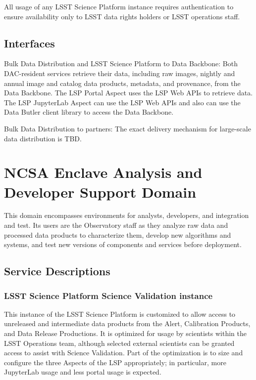 \documentclass[DM,toc]{lsstdoc}
\begin{document}
All usage of any LSST Science Platform instance requires authentication
to ensure availability only to LSST data rights holders or LSST
operations staff.

\subsection{Interfaces}\label{dac-interfaces}

Bulk Data Distribution and LSST Science Platform to Data Backbone: Both
DAC-resident services retrieve their data, including raw images, nightly and
annual image and catalog data products, metadata, and provenance, from the Data
Backbone.  The LSP Portal Aspect uses the LSP Web APIs to retrieve data.  The
LSP JupyterLab Aspect can use the LSP Web APIs and also can use the Data Butler
client library to access the Data Backbone.

Bulk Data Distribution to partners: The exact delivery mechanism for
large-scale data distribution is TBD.


\section{NCSA Enclave Analysis and Developer Support
Domain}\label{ncsa-enclave-analysis-and-developer-support-domain}

This domain encompasses environments for analysts, developers, and
integration and test. Its users are the Observatory staff as they
analyze raw data and processed data products to characterize them,
develop new algorithms and systems, and test new versions of components
and services before deployment.

\subsection{Service Descriptions}\label{ncsa-ads-service-descriptions}

\subsubsection{LSST Science Platform Science Validation
instance}\label{lsst-science-platform-science-validation-instance}

This instance of the LSST Science Platform is customized to allow access
to unreleased and intermediate data products from the Alert, Calibration
Products, and Data Release Productions. It is optimized for usage by
scientists within the LSST Operations team, although selected external
scientists can be granted access to assist with Science Validation. Part
of the optimization is to size and configure the three Aspects of the
LSP appropriately; in particular, more JupyterLab usage and less portal
usage is expected.
\end{document}
